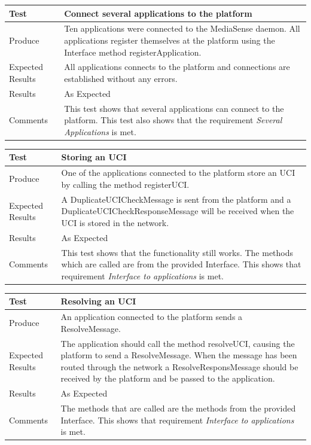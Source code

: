 \begin{center}
    \begin{tabular}{ | l | p{12cm} |}
    \hline
    Test 	 				& 		 Connect several applications to the platform\\ \hline
	Produce  				& 		 Ten applications were connected to the MediaSense daemon. All applications register themselves at the platform using the Interface method registerApplication.\\ \hline
	Expected Results  		& 		 All applications connects to the platform and connections are established without any errors.\\ \hline
	Results 				& 		 As Expected\\ \hline
	Comments				& 		 This test shows that several applications can connect to the platform. This test also shows that the requirement \emph{Several Applications} is met.\\ \hline
    \end{tabular}
\end{center}

\begin{center}
    \begin{tabular}{ | l | p{12cm} |}
    \hline
    Test 	 				& 		 Storing an UCI\\ \hline
	Produce  				& 		 One of the applications connected to the platform store an UCI by calling the method registerUCI.\\ \hline
	Expected Results  		& 		 A DuplicateUCICheckMessage is sent from the platform and a DuplicateUCICheckResponseMessage will be received when the UCI is stored in the network.\\ \hline
	Results 				& 		 As Expected\\ \hline
	Comments				& 		 This test shows that the functionality still works. The methods which are called are from the provided Interface. This shows that requirement \emph{Interface to applications} is met.\\ \hline
    \end{tabular}
\end{center}

\begin{center}
    \begin{tabular}{ | l | p{12cm} |}
    \hline
    Test 	 				& 		 Resolving an UCI\\ \hline
	Produce  				& 		 An application connected to the platform sends a ResolveMessage.\\ \hline
	Expected Results  		& 		 The application should call the method resolveUCI, causing the platform to send a ResolveMessage. When the message has been routed through the network a ResolveResponsMessage should be received by the platform and be passed to the application. \\ \hline
	Results 				& 		 As Expected\\ \hline
	Comments				& 		 The methods that are called are the methods from the provided Interface. This shows that requirement \emph{Interface to applications} is met.\\ \hline
    \end{tabular}
\end{center}

